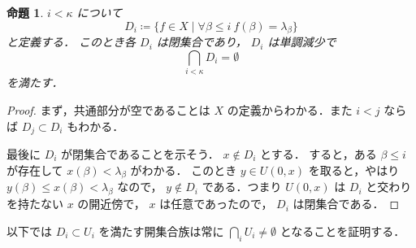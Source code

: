 \documentclass[leqno, 12pt]{ltjsarticle}
\newtheorem{prop}[thm]{命題}
\newcommand{\basicopen}[2]{U(#1,#2)}
\begin{document}
\begin{prop}
$i<\kappa$
について
\[
D_{i}\coloneqq\{f\in X \mid \forall \beta\le i\  f(\beta)=\lambda_{\beta}\}
\]
と定義する．
このとき各
$D_{i}$
は閉集合であり，
$D_{i}$
は単調減少で
\[
\bigcap_{i<\kappa}D_{i}=\emptyset
\]
を満たす．
\end{prop}
\begin{proof}
まず，共通部分が空であることは
$X$
の定義からわかる．また
$i<j$
ならば
$D_{j}\subset D_{i}$
もわかる．

最後に
$D_{i}$
が閉集合であることを示そう．
$x\notin D_{i}$
とする．
すると，ある
$\beta\le i$
が存在して
$x(\beta)<\lambda_{\beta}$
がわかる．
このとき
$y\in \basicopen{0}{x}$
を取ると，やはり
$y(\beta)\le x(\beta)<\lambda_{\beta}$
なので，
$y\notin D_{i}$
である．つまり
$\basicopen{0}{x}$
は
$D_{i}$
と交わりを持たない
$x$
の開近傍で，
$x$
は任意であったので，
$D_{i}$
は閉集合である．

\end{proof}

以下では
$D_{i}\subset U_{i}$
を満たす開集合族は常に
$\bigcap_{i}U_{i}\neq\emptyset$
となることを証明する．
\end{document}
